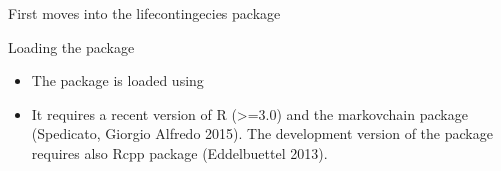 \begin{frame}[fragile]{First moves into the lifecontingecies package}

\begin{block}{Loading the package}

\begin{itemize}[<+->]
\itemsep1pt\parskip0pt
\item
  The package is loaded using
\end{itemize}

\begin{Shaded}
\begin{Highlighting}[]
\end{Highlighting}
\end{Shaded}

\begin{itemize}[<+->]
\itemsep1pt\parskip0pt
\item
  It requires a recent version of R (\textgreater{}=3.0) and the
  markovchain package (Spedicato, Giorgio Alfredo 2015). The development
  version of the package requires also Rcpp package (Eddelbuettel 2013).
\end{itemize}

\end{block}

\end{frame}


